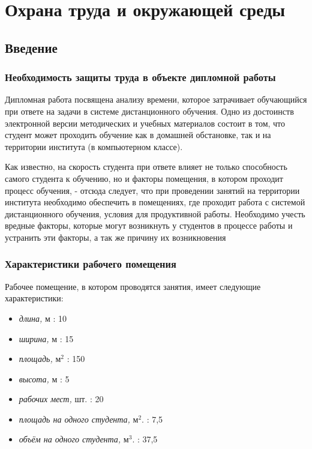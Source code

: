 \chapter{Охрана труда и окружающей среды}
\label{mainpart}  
\section{Введение}

\subsection{Необходимость защиты труда в объекте дипломной работы}

Дипломная работа посвящена анализу времени, которое затрачивает обу\-чающийся при ответе на задачи в системе дистанционного обучения. Одно из достоинств электронной версии методических и учебных материалов состоит в том, что студент может проходить обучение как в домашней обстановке, так и на территории института (в компьютерном классе). 

Как известно, на скорость студента при ответе влияет не только способ\-ность самого студента к обучению, но и факторы помещения, в котором проходит процесс обучения, - отсюда следует, что при проведении занятий на территории института необходимо  обеспечить в помещениях, где проходит работа с системой дистанционного обучения, условия для продуктивной ра\-боты. Необходимо учесть вредные факторы, которые могут возникнуть у студентов в процессе работы и устранить эти факторы, а так же причину их возникновения

\subsection{Характеристики рабочего помещения}
\label{hro}

Рабочее помещение, в котором проводятся занятия, имеет следующие ха\-рактеристики:

\begin{itemize}
\item {\itshape длина,} м : 10
\item {\itshape ширина,} м : 15
\item {\itshape площадь,} м$^2$ : 150
\item {\itshape высота,} м : 5
\item {\itshape рабочих мест,} шт. : 20
\item {\itshape площадь на одного студента,} м$^2$. : 7,5
\item {\itshape объём на одного студента,} м$^3$. : 37,5
\end{itemize}

